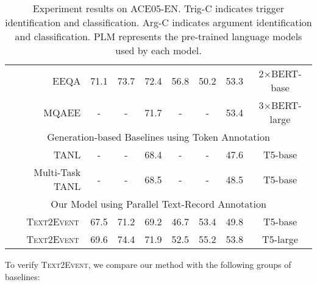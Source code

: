 \documentclass[11pt,a4paper]{article}
\newcommand\modelname{\textsc{Text2Event}}
\begin{document}
\begin{table*}[!t]
\begin{tabular}{r|ccc|ccc|c}
    \midrule
    EEQA \citep{du-cardie-2020-event}                       & 71.1                                & 73.7                               & 72.4                             & 56.8       & 50.2       & 53.3        & 2$\times$BERT-base  \\
    MQAEE  \citep{li-etal-2020-event}                       & -                                   & -                                  & 71.7                             & -          & -          & 53.4        & 3$\times$BERT-large \\
    \midrule
    \multicolumn{8}{c}{Generation-based Baselines using Token Annotation}                                                                                                                                                               \\
    \midrule
    TANL \citep{paolini2021structured}                      & -                                   & -                                  & 68.4                             & -          & -          & 47.6        & T5-base             \\
    Multi-Task TANL \citep{paolini2021structured}           & -                                   & -                                  & 68.5                             & -          & -          & 48.5        & T5-base             \\
    \midrule
    \multicolumn{8}{c}{Our Model using Parallel Text-Record Annotation}                                                                                                                                                                 \\
    \midrule
    \modelname\,                                            & 67.5                                & 71.2                               & 69.2                             & 46.7       & 53.4       & 49.8        & T5-base             \\
    \modelname\,                                            & 69.6                                & 74.4                               & 71.9                             & 52.5       & 55.2       & 53.8        & T5-large            \\
    \bottomrule
  \end{tabular}
  \caption{Experiment results on ACE05-EN.
    Trig-C indicates trigger identification and classification.
    Arg-C indicates argument identification and classification.
    PLM represents the pre-trained language models used by each model.
  }
  \label{tab:overall_ace2005}\end{table*} 
To verify \modelname, we compare our method with the following groups of baselines:
\end{document}
